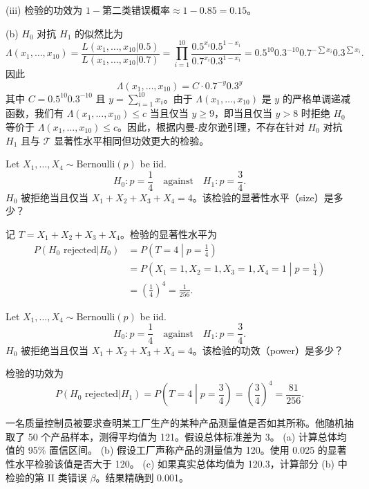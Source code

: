 \begin{questions}
\begin{solution}
(iii) 检验的功效为 $1 - \text{第二类错误概率} \approx 1 - 0.85 = 0.15$。

(b) $H_0$ 对抗 $H_1$ 的似然比为
\[
\Lambda(x_1, \dots, x_{10}) = \frac{L(x_1, \dots, x_{10} | 0.5)}{L(x_1, \dots, x_{10} | 0.7)} = \prod_{i=1}^{10} \frac{0.5^{x_i} 0.5^{1-x_i}}{0.7^{x_i} 0.3^{1-x_i}} = 0.5^{10} 0.3^{-10} 0.7^{-\sum x_i} 0.3^{\sum x_i}.
\]
因此
\[
\Lambda(x_1, \dots, x_{10}) = C \cdot 0.7^{-y} 0.3^y
\]
其中 $C = 0.5^{10} 0.3^{-10}$ 且 $y = \sum_{i=1}^{10} x_i$。由于 $\Lambda(x_1, \dots, x_{10})$ 是 $y$ 的严格单调递减函数，我们有 $\Lambda(x_1, \dots, x_{10}) \le c$ 当且仅当 $y \ge 9$，即当且仅当 $y > 8$ 时拒绝 $H_0$ 等价于 $\Lambda(x_1, \dots, x_{10}) \le c$。因此，根据内曼-皮尔逊引理，不存在针对 $H_0$ 对抗 $H_1$ 且与 $\mathcal{T}$ 显著性水平相同但功效更大的检验。
\end{solution}
    \question Let $X_1, \dots, X_4 \sim \text{Bernoulli}(p)$ be iid.
\[
H_0 : p = \frac{1}{4} \quad \text{against} \quad H_1 : p = \frac{3}{4}.
\]
$H_0$ 被拒绝当且仅当 $X_1 + X_2 + X_3 + X_4 = 4$。该检验的显著性水平（size）是多少？

\begin{solution}
记 $T = X_1 + X_2 + X_3 + X_4$。检验的显著性水平为
\begin{align*}
P(H_0 \text{ rejected} | H_0) &= P\left( T = 4 \middle| p = \frac{1}{4} \right) \\
&= P\left( X_1 = 1, X_2 = 1, X_3 = 1, X_4 = 1 \middle| p = \frac{1}{4} \right) \\
&= \left( \frac{1}{4} \right)^4 = \frac{1}{256}.
\end{align*}
\end{solution}

\question Let $X_1, \dots, X_4 \sim \text{Bernoulli}(p)$ be iid.
\[
H_0 : p = \frac{1}{4} \quad \text{against} \quad H_1 : p = \frac{3}{4}.
\]
$H_0$ 被拒绝当且仅当 $X_1 + X_2 + X_3 + X_4 = 4$。该检验的功效（power）是多少？

\begin{solution}
检验的功效为
\[
P(H_0 \text{ rejected} | H_1) = P\left( T = 4 \middle| p = \frac{3}{4} \right) = \left( \frac{3}{4} \right)^4 = \frac{81}{256}.
\]
\end{solution}
    \question
一名质量控制员被要求查明某工厂生产的某种产品测量值是否如其所称。他随机抽取了 50 个产品样本，测得平均值为 121。假设总体标准差为 3。
(a) 计算总体均值的 95\% 置信区间。
(b) 假设工厂声称产品的测量值为 120。使用 0.025 的显著性水平检验该值是否大于 120。
(c) 如果真实总体均值为 120.3，计算部分 (b) 中检验的第 II 类错误 $\beta$。结果精确到 0.001。


\end{questions}

